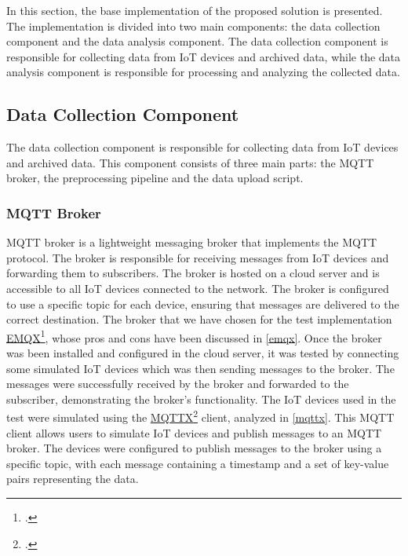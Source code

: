 In this section, the base implementation of the proposed solution is presented. The implementation is divided into two main components: the data collection component and the data analysis component. The data collection component is responsible for collecting data from IoT devices and archived data, while the data analysis component is responsible for processing and analyzing the collected data.

\subsection{Data Collection Component}

The data collection component is responsible for collecting data from IoT devices and archived data. This component consists of three main parts: the MQTT broker, the preprocessing pipeline and the data upload script.

\subsubsection{MQTT Broker}
MQTT broker is a lightweight messaging broker that implements the MQTT protocol. The broker is responsible for receiving messages from IoT devices and forwarding them to subscribers. The broker is hosted on a cloud server and is accessible to all IoT devices connected to the network. The broker is configured to use a specific topic for each device, ensuring that messages are delivered to the correct destination. 
The broker that we have chosen for the test implementation \href{https://www.emqx.io/}{EMQX}\footcite{site:emqx}, whose pros and cons have been discussed in \ref{emqx}.
Once the broker was been installed and configured in the cloud server, it was tested by connecting some simulated IoT devices which was then sending messages to the broker. The messages were successfully received by the broker and forwarded to the subscriber, demonstrating the broker's functionality.
The IoT devices used in the test were simulated using the \href{https://mqttx.app/}{MQTTX}\footcite{site:mqttx} client, analyzed in \ref{mqttx}. This MQTT client allows users to simulate IoT devices and publish messages to an MQTT broker. The devices were configured to publish messages to the broker using a specific topic, with each message containing a timestamp and a set of key-value pairs representing the data.

